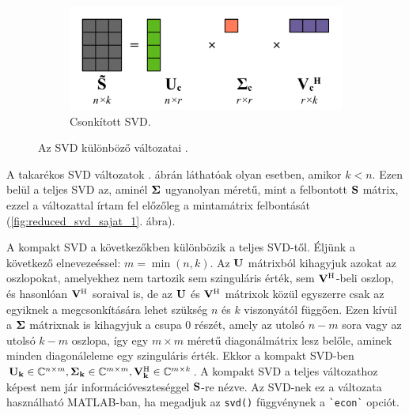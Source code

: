 \begin{figure}[h!]
                \begin{subfigure}{0.48\textwidth}
                    \includegraphics[width=\textwidth]{kep/reduced_svd_sajat_4.pdf}
                    \caption{Csonkított SVD.}
                    \label{fig:reduced_svd_sajat_4}
                \end{subfigure}
                \caption{Az SVD különböző változatai \cite{WikipediaSVD}.}
                \label{fig:reduced_svd_sajat}
            \end{figure}
            A takarékos SVD változatok . ábrán láthatóak olyan esetben, amikor $k < n$. Ezen belül a teljes SVD az, aminél ${\bf \Sigma}$ ugyanolyan méretű, mint a felbontott ${\bf S}$ mátrix, ezzel a változattal írtam fel előzőleg a mintamátrix felbontását (\ref{fig:reduced_svd_sajat_1}. ábra).
            \par
            A kompakt SVD a következőkben különbözik a teljes SVD-től. Éljünk a következő elnevezeéssel: $m=\min(n,k)$. Az ${\bf U}$ mátrixból kihagyjuk azokat az oszlopokat, amelyekhez nem tartozik sem szinguláris érték, sem ${\bf V^{\mathrm{H}}}$-beli oszlop, és hasonlóan ${\bf V^{\mathrm{H}}}$ soraival is, de az ${\bf U}$ és ${\bf V^{\mathrm{H}}}$ mátrixok közül egyszerre csak az egyiknek a megcsonkítására lehet szükség $n$ és $k$ viszonyától függően. Ezen kívül a ${\bf \Sigma}$ mátrixnak is kihagyjuk a csupa 0 részét, amely az utolsó $n-m$ sora vagy az utolsó $k-m$ oszlopa, így egy $m \times m$ méretű diagonálmátrix lesz belőle, aminek minden diagonáleleme egy szinguláris érték. Ekkor a kompakt SVD-ben ${\bf U_k} \in \mathbb{C}^{n\times m}, {\bf\Sigma_k} \in \mathbb{C}^{m\times m}, {\bf V_k^{\mathrm{H}}} \in \mathbb{C}^{m\times k}$. A kompakt SVD a teljes változathoz képest nem jár információveszteséggel ${\bf S}$-re nézve. Az SVD-nek ez a változata használható MATLAB-ban, ha megadjuk az \verb|svd()| függvénynek a \verb|`econ`| opciót.
            \par
